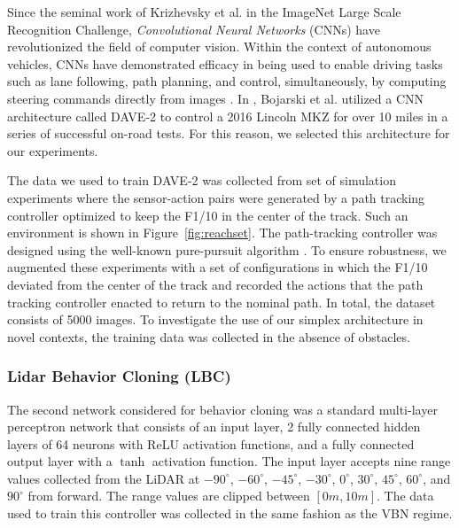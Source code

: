 \documentclass[manuscript,screen,review]{acmart}
\newcommand{\figref}[1]{Figure~\ref{#1}}
\begin{document}
Since the seminal work of Krizhevsky et al. \cite{AlexNet2012} in the ImageNet Large Scale Recognition Challenge, \emph{Convolutional Neural Networks} (CNNs) have revolutionized the field of computer vision. Within the context of autonomous vehicles, CNNs have demonstrated efficacy in being used to enable driving tasks such as lane following, path planning, and control, simultaneously, by computing steering commands directly from images \cite{DeepDrive2015}. In \cite{bojarski2016end}, Bojarski et al. utilized a CNN architecture called DAVE-2 to control a 2016 Lincoln MKZ for over 10 miles in a series of successful on-road tests. For this reason, we selected this architecture for our experiments. 

The data we used to train DAVE-2 was collected from set of simulation experiments where the sensor-action pairs were generated by a path tracking controller optimized to keep the F1/10 in the center of the track. Such an environment is shown in \figref{fig:reachset}. The path-tracking controller was designed using the well-known pure-pursuit algorithm \cite{coulter1992implementation}. To ensure robustness, we augmented these experiments with a set of configurations in which the F1/10 deviated from the center of the track and recorded the actions that the path tracking controller enacted to return to the nominal path. In total, the dataset consists of 5000 images.  To investigate the use of our simplex architecture in novel contexts, the training data was collected in the absence of obstacles.
 



\subsubsection{Lidar Behavior Cloning (LBC)}
\label{sec:lidar cloning}
The second network considered for behavior cloning was a standard multi-layer perceptron network that consists of an input layer, 2 fully connected hidden layers of 64 neurons with ReLU activation functions, and a fully connected output layer with a $\tanh$ activation function. The input layer accepts nine range values collected from the LiDAR at $-90^{\circ}$, $-60^{\circ}$, $-45^{\circ}$, $-30^{\circ}$, $0^{\circ}$, $30^{\circ}$, $45^{\circ}$, $60^{\circ}$, and $90^{\circ}$ from forward. The range values are clipped between $[0m, 10m]$. The data used to train this controller was collected in the same fashion as the VBN regime. 
\end{document}

